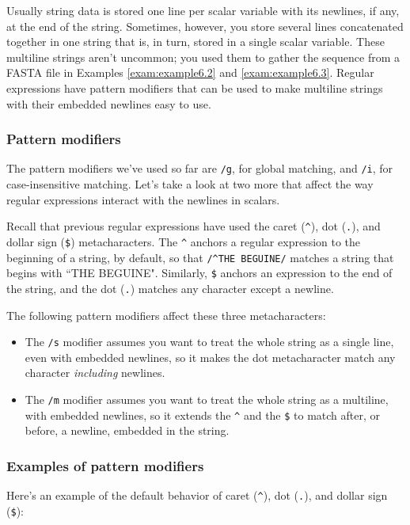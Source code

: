Usually string data is stored one line per scalar variable with its newlines, if any, at the end of the string. Sometimes, however, you store several lines concatenated together in one string that is, in turn, stored in a single scalar variable. These multiline strings aren't uncommon; you used them to gather the sequence from a FASTA file in Examples \autoref{exam:example6.2} and \autoref{exam:example6.3}. Regular expressions have pattern modifiers that can be used to make multiline strings with their embedded newlines easy to use.

\subsubsection{Pattern modifiers}
The pattern modifiers we've used so far are \verb|/g|, for global matching, and \verb|/i|, for case-insensitive matching. Let's take a look at two more that affect the way regular expressions interact with the newlines in scalars.

Recall that previous regular expressions have used the caret (\verb|^|), dot (\verb|.|), and dollar sign (\verb|$|) metacharacters. The \verb|^| anchors a regular expression to the beginning of a string, by default, so that \verb|/^THE BEGUINE/| matches a string that begins with ``THE BEGUINE". Similarly, \verb|$| anchors an expression to the end of the string, and the dot (\verb|.|) matches any character except a newline.

The following pattern modifiers affect these three metacharacters:

\begin{itemize}
  \item The \verb|/s| modifier assumes you want to treat the whole string as a single line, even with embedded newlines, so it makes the dot metacharacter match any character \textit{including} newlines.
  \item The \verb|/m| modifier assumes you want to treat the whole string as a multiline, with embedded newlines, so it extends the \verb|^| and the \verb|$| to match after, or before, a newline, embedded in the string.
\end{itemize}

\subsubsection{Examples of pattern modifiers}
Here's an example of the default behavior of caret (\verb|^|), dot (\verb|.|), and dollar sign (\verb|$|):

